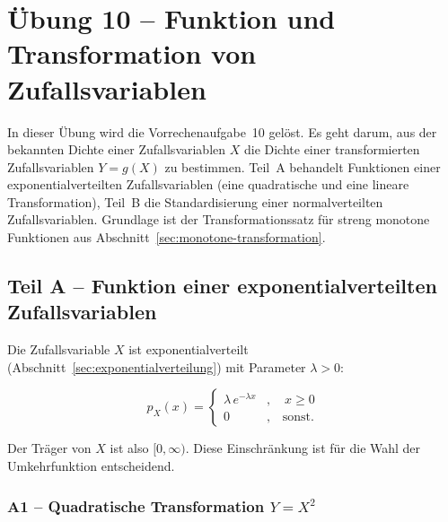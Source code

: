\section{Übung 10 – Funktion und Transformation von Zufallsvariablen}

In dieser Übung wird die Vorrechenaufgabe~10 gelöst. Es geht darum, aus der
bekannten Dichte einer Zufallsvariablen $X$ die Dichte einer transformierten
Zufallsvariablen $Y = g(X)$ zu bestimmen. Teil~A behandelt Funktionen einer
exponentialverteilten Zufallsvariablen (eine quadratische und eine lineare
Transformation), Teil~B die Standardisierung einer normalverteilten
Zufallsvariablen. Grundlage ist der Transformationssatz für streng monotone
Funktionen aus Abschnitt~\ref{sec:monotone-transformation}.

\subsection*{Teil A – Funktion einer exponentialverteilten Zufallsvariablen}

Die Zufallsvariable $X$ ist exponentialverteilt
(Abschnitt~\ref{sec:exponentialverteilung}) mit Parameter $\lambda > 0$:

$$
p_X(x) = \begin{cases} \lambda\, e^{-\lambda x} & , \quad x \geq 0 \\[2pt]
0 & , \quad \text{sonst.} \end{cases}
$$

Der Träger von $X$ ist also $[0, \infty)$. Diese Einschränkung ist für die
Wahl der Umkehrfunktion entscheidend.

\subsubsection*{A1 – Quadratische Transformation $Y = X^2$}

